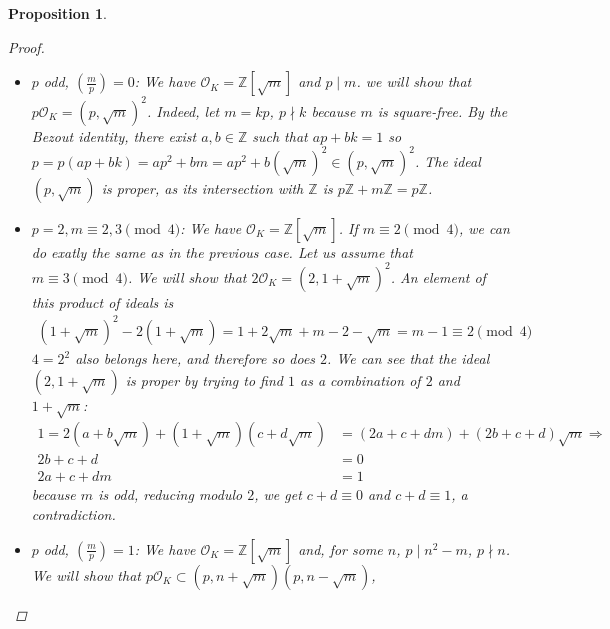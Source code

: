 \documentclass[11pt]{article}
\newtheorem{prop}{Proposition}
\theoremstyle{definition}
\begin{document}
\begin{prop}
\begin{proof}
            \begin{itemize}
                \item $p$ odd, $\left( \frac{m}{p} \right) = 0$: We have $\mathcal{O}_K = \mathbb{Z}\left[\sqrt {m}\right]$ and $p \mid m$.
                we will show that $p\mathcal{O}_K = \left(p, \sqrt {m}\right)^2$.
                Indeed, let $m = kp$, $p \nmid k$ because $m$ is square-free.
                By the Bezout identity, there exist $a, b \in \mathbb{Z}$ such that $ap + bk = 1$ so
                $p = p(ap+bk) = ap^2 + bm = ap^2 + b\left(\sqrt {m}\right)^2 \in \left(p, \sqrt {m}\right)^2$.
                The ideal $\left(p, \sqrt {m}\right)$ is proper,
                as its intersection with $\mathbb{Z}$ is $p\mathbb{Z} + m\mathbb{Z} = p\mathbb{Z}$.

                \item $p=2, m \equiv 2, 3 \pmod 4$:
                We have $\mathcal{O}_K = \mathbb{Z}\left[\sqrt {m}\right]$.
                If $m \equiv 2 \pmod 4$, we can do exatly the same as in the previous case.
                Let us assume that $m \equiv 3 \pmod 4$.
                We will show that $2\mathcal{O}_K = \left(2, 1 + \sqrt {m}\right)^2$.
                An element of this product of ideals is
                \begin{align}
                (1 + \sqrt {m})^2 - 2 (1+\sqrt {m}) = 1 + 2 \sqrt {m} + m - 2 - \sqrt {m} = m - 1 \equiv 2 \pmod 4 \nonumber
                \end{align}
                $4 = 2^2$ also belongs here, and therefore so does $2$.
                We can see that the ideal $(2, 1 + \sqrt {m})$ is proper by trying to find $1$ as a combination of $2$ and $1 + \sqrt {m}$:
                \begin{align*}
                    1 = 2\left(a + b\sqrt {m}\right) + \left(1 + \sqrt {m}\right) \left(c+d\sqrt {m}\right) &= (2a + c + dm) + (2b + c + d) \sqrt {m} \Rightarrow \\
                    2b+c+d&=0 \\
                    2a+c+dm&=1
                \end{align*}
                because $m$ is odd, reducing modulo $2$, we get $c+d \equiv 0$ and $c+d \equiv 1$, a contradiction.
                \item $p$ odd, $\left( \frac{m}{p} \right) = 1$:
                We have $\mathcal{O}_K = \mathbb{Z}\left[\sqrt {m}\right]$ and, for some $n$, $p \mid n^2 - m$, $p \nmid n$.
                We will show that $p\mathcal{O}_K \subset \left(p, n + \sqrt {m}\right)\left(p, n - \sqrt {m}\right)$,

\end{itemize}
\end{proof}
\end{prop}
\end{document}
